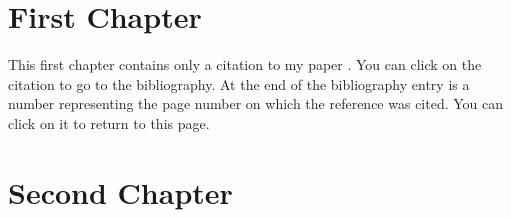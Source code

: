 \documentclass{report}
\begin{document}
    \chapter{First Chapter}
    This first chapter contains only a citation to my paper \cite{whitaker:20:mwf}.
    You can click on the citation to go to the bibliography.
    At the end of the bibliography entry
    is a number representing the page number
    on which the reference was cited.
    You can click on it to return to this page.

    \chapter{Second Chapter}
    \lipsum[1-3]

    
    
\end{document}
